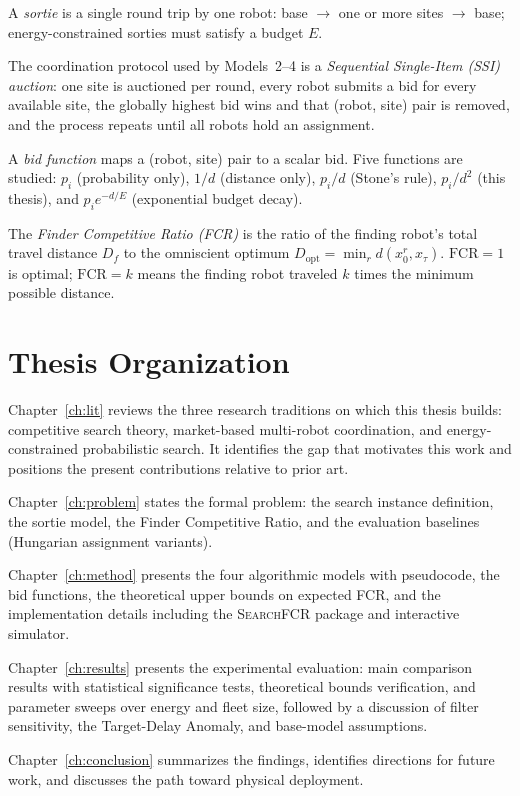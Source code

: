\begin{doublespacing}
A \emph{sortie} is a single round trip by one robot: base $\rightarrow$
one or more sites $\rightarrow$ base; energy-constrained sorties must
satisfy a budget $E$.

The coordination protocol used by Models~2--4 is a
\emph{Sequential Single-Item (SSI) auction}: one site is auctioned per
round, every robot submits a bid for every available site, the globally
highest bid wins and that (robot, site) pair is removed, and the process
repeats until all robots hold an assignment.

A \emph{bid function} maps a (robot, site) pair to a scalar bid.
Five functions are studied: $p_i$ (probability only), $1/d$
(distance only), $p_i/d$ (Stone's rule), $p_i/d^2$ (this thesis),
and $p_i e^{-d/E}$ (exponential budget decay).

The \emph{Finder Competitive Ratio (FCR)} is the ratio of the finding
robot's total travel distance $D_f$ to the omniscient optimum
$D_{\mathrm{opt}} = \min_r d(x_0^r, x_\tau)$.
$\mathrm{FCR} = 1$ is optimal; $\mathrm{FCR} = k$ means the finding
robot traveled $k$ times the minimum possible distance.

\section{Thesis Organization}

Chapter~\ref{ch:lit} reviews the three research traditions on which
this thesis builds: competitive search theory, market-based
multi-robot coordination, and energy-constrained probabilistic search.
It identifies the gap that motivates this work and positions the
present contributions relative to prior art.

Chapter~\ref{ch:problem} states the formal problem: the search instance
definition, the sortie model, the Finder Competitive Ratio, and the
evaluation baselines (Hungarian assignment variants).

Chapter~\ref{ch:method} presents the four algorithmic models with
pseudocode, the bid functions, the theoretical upper bounds on
expected FCR, and the implementation details including the
\textsc{SearchFCR} package and interactive simulator.

Chapter~\ref{ch:results} presents the experimental evaluation:
main comparison results with statistical significance tests,
theoretical bounds verification, and parameter sweeps over energy
and fleet size, followed by a discussion of filter sensitivity,
the Target-Delay Anomaly, and base-model assumptions.

Chapter~\ref{ch:conclusion} summarizes the findings, identifies
directions for future work, and discusses the path toward physical
deployment.

\end{doublespacing}
